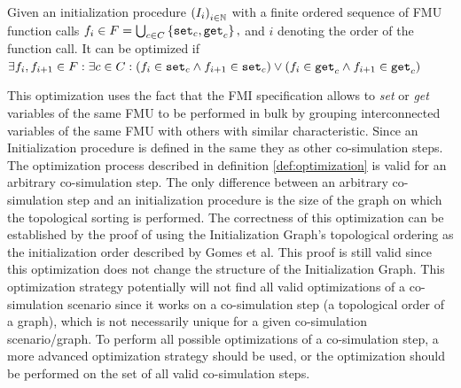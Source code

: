 \documentclass[runningheads]{llncs}
\begin{document}
\begin{definition}\label{def:optimization}
  Given an initialization procedure $ \left( I_i \right)_{i \in \mathbb{N}}$ with a finite ordered sequence of FMU function calls $f_i \in F = \bigcup_{c \in C}  \left\{ \mathtt{set}_{c},\mathtt{get}_{c} \right\},$ and $i$ denoting the order of the function call. It can be optimized if $\exists f_i, f_{i +1} \in F : \exists c \in C :(f_i \in {\mathtt{set}_{c}} \land f_{i+1} \in {\mathtt{set}_{c}}) \lor (f_i \in {\mathtt{get}_{c}} \land f_{i+1} \in {\mathtt{get}_{c}})$
\end{definition}
This optimization uses the fact that the FMI specification allows to \textit{set} or \textit{get} variables of the same FMU to be performed in bulk by grouping interconnected variables of the same FMU with others with similar characteristic.
Since an Initialization procedure is defined in the same they as other co-simulation steps. The optimization process described in definition \ref{def:optimization} is valid for an arbitrary co-simulation step. The only difference between an arbitrary co-simulation step and an initialization procedure is the size of the graph on which the topological sorting is performed. 
The correctness of this optimization can be established by the proof of using the Initialization Graph's topological ordering as the initialization order described by Gomes et al. This proof is still valid since this optimization does not change the structure of the Initialization Graph. 
This optimization strategy potentially will not find all valid optimizations of a co-simulation scenario since it works on a co-simulation step (a topological order of a graph), which is not necessarily unique for a given co-simulation scenario/graph. To perform all possible optimizations of a co-simulation step, a more advanced optimization strategy should be used, or the optimization should be performed on the set of all valid co-simulation steps.
\end{document}
